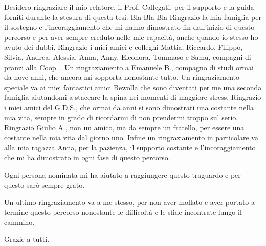 \documentclass[12pt,a4paper,openright,twoside]{book}
\begin{document}
\begin{acknowledgements} %
    Desidero ringraziare il mio relatore, il Prof. Callegati, per il supporto e la guida forniti durante la stesura di questa tesi. Bla Bla Bla
    Ringrazio la mia famiglia per il sostegno e l'incoraggiamento che mi hanno dimostrato fin dall'inizio di questo percorso e per aver sempre creduto nelle mie capacità, anche quando io stesso ho avuto dei dubbi.
    Ringrazio i miei amici e colleghi Mattia, Riccardo, Filippo, Silvia, Andrea, Alessia, Anna, Anny, Eleonora, Tommaso e Samu, compagni di pranzi alla Coop... 
    Un ringraziamento a Emanuele B., compagno di studi ormai da nove anni, che ancora mi sopporta nonostante tutto.
    Un ringraziamento speciale va ai miei fantastici amici Bewolla che sono diventati per me una seconda famiglia aiutandomi a staccare la spina nei momenti di maggiore stress.
    Ringrazio i miei amici del G.D.S., che ormai da anni si sono dimostrati una costante nella mia vita, sempre in grado di ricordarmi di non prendermi troppo sul serio.
    Ringrazio Giulio A., non un amico, ma da sempre un fratello, per essere una costante nella mia vita dal giorno uno.
    Infine un ringraziamento in particolare va alla mia ragazza Anna, per la pazienza, il supporto costante e l’incoraggiamento che mi ha dimostrato in ogni fase di questo percorso.

    Ogni persona nominata mi ha aiutato a raggiungere questo traguardo e per questo sarò sempre grato.

    Un ultimo ringraziamento va a me stesso, per non aver mollato e aver portato a termine questo percorso nonostante le difficoltà e le sfide incontrate lungo il cammino.

    Grazie a tutti.
\end{acknowledgements}
\end{document}
